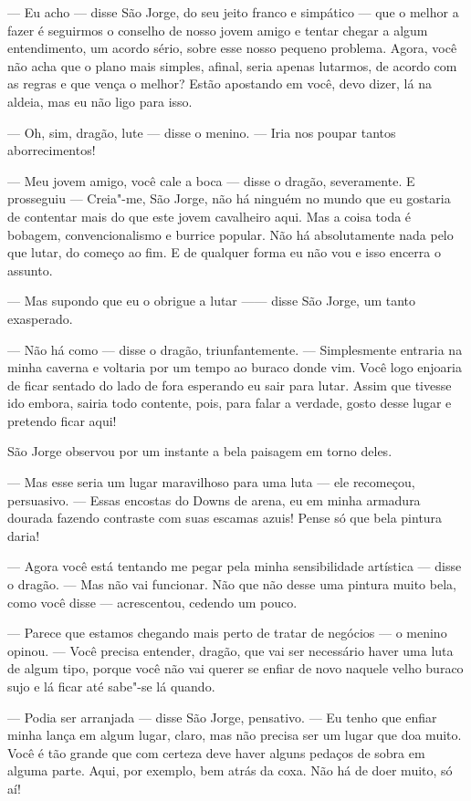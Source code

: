 --- Eu acho --- disse São Jorge, do seu jeito franco e simpático --- que o
melhor a fazer é seguirmos o conselho de nosso jovem amigo e tentar
chegar a algum entendimento, um acordo sério, sobre esse nosso
pequeno problema. Agora, você não acha que o plano mais simples,
afinal, seria apenas lutarmos, de acordo com as regras e que vença o
melhor? Estão apostando em você, devo dizer, lá na aldeia, mas eu
não ligo para isso.

--- Oh, sim, dragão, lute --- disse o menino. --- Iria nos poupar tantos
aborrecimentos!

--- Meu jovem amigo, você cale a boca --- disse o dragão, severamente. E
prosseguiu --- Creia"-me, São Jorge, não há ninguém no mundo que eu
gostaria de contentar mais do que este jovem cavalheiro aqui. Mas a
coisa toda é bobagem, convencionalismo e burrice popular. Não há
absolutamente nada pelo que lutar, do começo ao fim. E de qualquer
forma eu não vou e isso encerra o assunto.

--- Mas supondo que eu o obrigue a lutar ------ disse São Jorge, um tanto
exasperado.

--- Não há como --- disse o dragão, triunfantemente. --- Simplesmente
entraria na minha caverna e voltaria por um tempo ao buraco donde
vim. Você logo enjoaria de ficar sentado do lado de fora esperando
eu sair para lutar. Assim que tivesse ido embora, sairia todo
contente, pois, para falar a verdade, gosto desse lugar e pretendo
ficar aqui!

São Jorge observou por um instante a bela paisagem em torno deles.

--- Mas esse seria um lugar maravilhoso para uma luta --- ele recomeçou,
persuasivo. --- Essas encostas do Downs de arena, eu em minha armadura
dourada fazendo contraste com suas escamas azuis! Pense só que bela
pintura daria!

--- Agora você está tentando me pegar pela minha sensibilidade artística
--- disse o dragão. --- Mas não vai funcionar. Não que não desse uma
pintura muito bela, como você disse --- acrescentou, cedendo um pouco.

--- Parece que estamos chegando mais perto de tratar de negócios --- o
menino opinou. --- Você precisa entender, dragão, que vai ser
necessário haver uma luta de algum tipo, porque você não vai querer
se enfiar de novo naquele velho buraco sujo e lá ficar até sabe"-se lá
quando.

--- Podia ser arranjada --- disse São Jorge, pensativo. --- Eu tenho que
enfiar minha lança em algum lugar, claro, mas não precisa ser um
lugar que doa muito. Você é tão grande que com certeza deve haver
alguns pedaços de sobra em alguma parte. Aqui, por exemplo, bem atrás
da coxa. Não há de doer muito, só aí!

